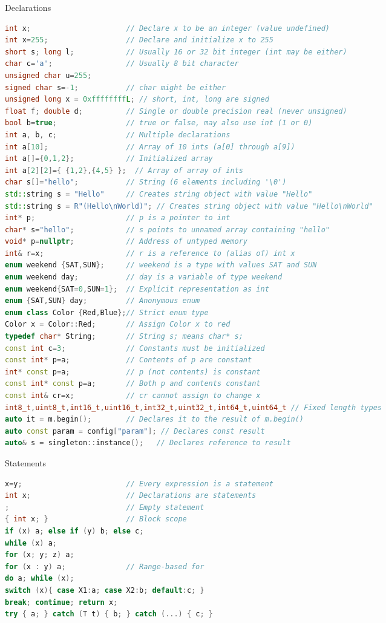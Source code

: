 \documentclass[final]{beamer}
\begin{document}
\begin{frame}[t,fragile]
\begin{columns}[t,totalwidth=0.95\paperwidth, colsep=0.05\paperwidth]
\begin{column}{0.3\paperwidth}
\begin{block}{Declarations}
\begin{lstlisting}[language=C++]
int x;                      // Declare x to be an integer (value undefined)
int x=255;                  // Declare and initialize x to 255
short s; long l;            // Usually 16 or 32 bit integer (int may be either)
char c='a';                 // Usually 8 bit character
unsigned char u=255;
signed char s=-1;           // char might be either
unsigned long x = 0xffffffffL; // short, int, long are signed
float f; double d;          // Single or double precision real (never unsigned)
bool b=true;                // true or false, may also use int (1 or 0)
int a, b, c;                // Multiple declarations
int a[10];                  // Array of 10 ints (a[0] through a[9])
int a[]={0,1,2};            // Initialized array
int a[2][2]={ {1,2},{4,5} };  // Array of array of ints
char s[]="hello";           // String (6 elements including '\0')
std::string s = "Hello"     // Creates string object with value "Hello"
std::string s = R"(Hello\nWorld)"; // Creates string object with value "Hello\nWorld"
int* p;                     // p is a pointer to int
char* s="hello";            // s points to unnamed array containing "hello"
void* p=nullptr;            // Address of untyped memory
int& r=x;                   // r is a reference to (alias of) int x
enum weekend {SAT,SUN};     // weekend is a type with values SAT and SUN
enum weekend day;           // day is a variable of type weekend
enum weekend{SAT=0,SUN=1};  // Explicit representation as int
enum {SAT,SUN} day;         // Anonymous enum
enum class Color {Red,Blue};// Strict enum type
Color x = Color::Red;       // Assign Color x to red
typedef char* String;       // String s; means char* s;
const int c=3;              // Constants must be initialized
const int* p=a;             // Contents of p are constant
int* const p=a;             // p (not contents) is constant
const int* const p=a;       // Both p and contents constant
const int& cr=x;            // cr cannot assign to change x
int8_t,uint8_t,int16_t,uint16_t,int32_t,uint32_t,int64_t,uint64_t // Fixed length types
auto it = m.begin();        // Declares it to the result of m.begin()
auto const param = config["param"]; // Declares const result
auto& s = singleton::instance();   // Declares reference to result
\end{lstlisting}
\end{block}


\begin{block}{Statements}
\begin{lstlisting}[language=C++]
x=y;                        // Every expression is a statement
int x;                      // Declarations are statements
;                           // Empty statement
{ int x; }                  // Block scope
if (x) a; else if (y) b; else c;
while (x) a;
for (x; y; z) a;
for (x : y) a;              // Range-based for
do a; while (x);
switch (x){ case X1:a; case X2:b; default:c; }
break; continue; return x;
try { a; } catch (T t) { b; } catch (...) { c; }


\end{lstlisting}
\end{block}
\end{column}
\end{columns}
\end{frame}
\end{document}
